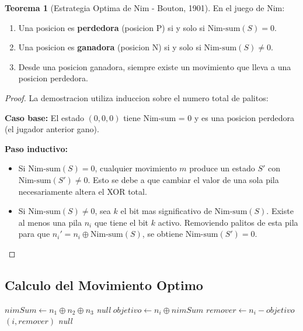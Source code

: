\documentclass[12pt,a4paper]{article}
\theoremstyle{definition}
\newtheorem{teorema}{Teorema}[section]
\begin{document}
\begin{teorema}[Estrategia Optima de Nim - Bouton, 1901]
En el juego de Nim:
\begin{enumerate}
    \item Una posicion es \textbf{perdedora} (posicion P) si y solo si $\text{Nim-sum}(S) = 0$.
    \item Una posicion es \textbf{ganadora} (posicion N) si y solo si $\text{Nim-sum}(S) \neq 0$.
    \item Desde una posicion ganadora, siempre existe un movimiento que lleva a una posicion perdedora.
\end{enumerate}
\end{teorema}

\begin{proof}
La demostracion utiliza induccion sobre el numero total de palitos:

\textbf{Caso base:} El estado $(0, 0, 0)$ tiene Nim-sum = 0 y es una posicion perdedora (el jugador anterior gano).

\textbf{Paso inductivo:} 
\begin{itemize}
    \item Si $\text{Nim-sum}(S) = 0$, cualquier movimiento $m$ produce un estado $S'$ con $\text{Nim-sum}(S') \neq 0$. Esto se debe a que cambiar el valor de una sola pila necesariamente altera el XOR total.
    
    \item Si $\text{Nim-sum}(S) \neq 0$, sea $k$ el bit mas significativo de $\text{Nim-sum}(S)$. Existe al menos una pila $n_i$ que tiene el bit $k$ activo. Removiendo palitos de esta pila para que $n_i' = n_i \oplus \text{Nim-sum}(S)$, se obtiene $\text{Nim-sum}(S') = 0$.
\end{itemize}
\end{proof}

\subsection{Calculo del Movimiento Optimo}

\begin{algorithm}[H]
\caption{Calculo del Movimiento Optimo en Nim}
\begin{algorithmic}[1]
    \State $nimSum \gets n_1 \oplus n_2 \oplus n_3$
        \State \Return \textit{null} 
    \EndIf
        \State $objetivo \gets n_i \oplus nimSum$
            \State $remover \gets n_i - objetivo$
                \State \Return $(i, remover)$
            \EndIf
        \EndIf
    \EndFor
    \State \Return \textit{null}
\EndFunction
\end{algorithmic}
\end{algorithm}
\end{document}
